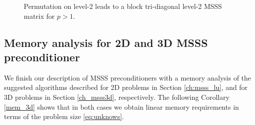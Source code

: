 {\begin{figure}[ht]
    \caption{Permutation on level-2 leads to a block tri-diagonal level-2 MSSS matrix for $p>1$.} \label{fig:precon3d_level2}
\end{figure}

\subsection{Memory analysis for 2D and 3D MSSS preconditioner}
We finish our description of MSSS preconditioners with a memory analysis of the suggested algorithms described for 2D problems in Section \ref{ch:msss_lu}, and for 3D problems in Section \ref{ch_msss3d}, respectively. The following Corollary \ref{mem_3d} shows that in both cases we obtain linear memory requirements in terms of the problem size \eqref{eq:unknows}.
\begin{figure}[ht]
    \centering
\end{figure}}
